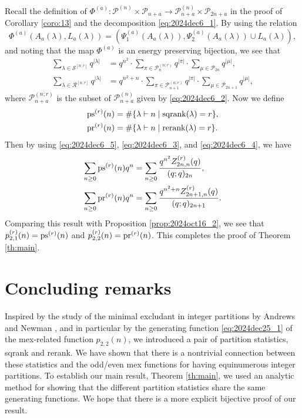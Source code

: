 \documentclass[sn-mathphys-num]{sn-jnl}%
\theoremstyle{thmstyleone}%
\theoremstyle{thmstyletwo}%
\theoremstyle{thmstylethree}%
\begin{document}
Recall the definition of
$\Phi^{(a)}: \mathscr{P}^{(n)} \times \mathscr{P}_{n+a} \rightarrow
\mathscr{P}^{(n)}_{n+a} \times \mathscr{P}_{2n+a}$ 
in the proof of Corollary \ref{coro:13} and the decomposition \eqref{eq:2024dec6_1}.
By using the relation
\begin{equation}
\Phi^{(a)} (A_a(\lambda), L_a(\lambda)) = (\Psi^{(a)}_1(A_a(\lambda)),\Psi_2^{(a)} (A_a(\lambda)) \cup  L_a(\lambda)),
\end{equation}
and noting that the map $\Phi^{(a)}$ is an energy preserving bijection,
we see that
\begin{align}
\sum_{\lambda \in \mathscr{S}^{[n;r]} }q^{|\lambda|} &= 
q^{n^2} \cdot 
\sum_{\pi \in \mathscr{P}^{(n;r)}_{n} }q^{|\pi|} \cdot
\sum_{\mu \in \mathscr{P}_{2n} }q^{|\mu|}, \label{eq:2024dec6_3}\\
\sum_{\lambda \in \mathscr{R}^{[n;r]} }q^{|\lambda|} &= 
q^{n^2+n} \cdot 
\sum_{\pi \in \mathscr{P}^{(n;r)}_{n+1} }q^{|\pi|} \cdot
\sum_{\mu \in \mathscr{P}_{2n+1} }q^{|\mu|},\label{eq:2024dec6_4}
\end{align}
where $\mathscr{P}^{(n;r)}_{n+a}$ is the subset of $\mathscr{P}^{(n)}_{n+a}$ given by
\eqref{eq:2024dec6_2}.
Now we define
\begin{align}
{\rm ps}^{(r)} (n) &= \# \{ \lambda \vdash n \mid {\rm sqrank} (\lambda) =r \}, \\
{\rm pr}^{(r)} (n) &= \# \{ \lambda \vdash n  \mid {\rm rerank} (\lambda) =r \}.
\end{align}
Then by using \eqref{eq:2024dec6_5}, \eqref{eq:2024dec6_3}, and \eqref{eq:2024dec6_4},
we have 
\begin{align*}
\sum_{n \geq 0} {\rm ps}^{(r)} (n) q^n
&=  \sum_{n \geq 0} \frac{q^{n^2} Z_{2n,n}^{(r)}(q)}{(q;q)_{2n}},  \\
\sum_{n \geq 0} {\rm pr}^{(r)} (n) q^n 
&=  \sum_{n \geq 0} \frac{q^{n^2+n} Z_{2n+1,n}^{(r)}(q)}{(q;q)_{2n+1}}.
\end{align*}
Comparing this result with
Proposition \ref{prop:2024oct16_2}, we see that $p^{(r)}_{2,1}(n)={\rm ps}^{(r)} (n)$ 
and $p^{(r)}_{2,2}(n)={\rm pr}^{(r)} (n)$.
This completes the proof of Theorem \ref{th:main}.

\section{Concluding remarks}\label{sec8}
Inspired by the study of the minimal excludant in integer partitions by
Andrews and Newman \cite{AN2020}, and in particular by the
generating function \eqref{eq:2024dec25_1} of
the mex-related function $p_{2,2}(n)$, we introduced a pair of partition statistics, sqrank and rerank.
We have shown that there is a nontrivial connection between these statistics and
the odd/even mex functions for having equinumerous integer partitions.
To establish our main result, Theorem \ref{th:main}, we used an analytic method for
showing that the different partition statistics
share the same generating functions.
We hope that there is a more explicit bijective proof of our result.  
\end{document}
